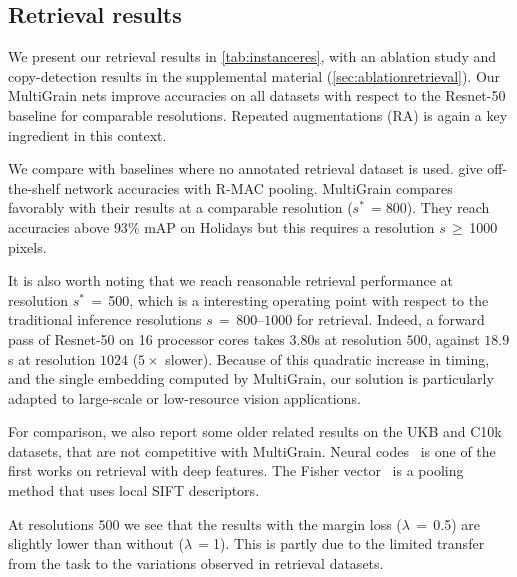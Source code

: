 \subsection{Retrieval results \label{sec:retrieval-results}}

We present our retrieval results in \cref{tab:instanceres}, with an ablation study and copy-detection results in the supplemental material (\ref{sec:ablationretrieval}). 
Our MultiGrain nets improve accuracies on all datasets with respect to the Resnet-50 baseline for comparable resolutions. 
Repeated augmentations (RA) is again a key ingredient in this context.

We compare with baselines where no annotated retrieval dataset is used. 
\cite{Gordo2016DeepIR,Gordo2017EndtoEndLO} give off-the-shelf network accuracies with R-MAC pooling. 
MultiGrain compares favorably with their results at a comparable resolution ($s^*$\,$=$800). 
They reach accuracies above $93\%$ mAP on Holidays but this requires a resolution $s$\,$\ge$\,1000 pixels. %

It is also worth noting that we reach reasonable retrieval performance at resolution $s^*$\,$=$\,500, which is a interesting operating point with respect to the traditional inference resolutions $s$\,$=$\,$800$--$1000$ for retrieval. 
Indeed, a forward pass of Resnet-50 on 16 processor cores takes $3.80$s at resolution $500$, against $18.9$s at resolution $1024$ ($5\times$ slower).
%
Because of this quadratic increase in timing, and the single embedding computed by MultiGrain, our solution is particularly adapted to large-scale or low-resource vision applications.

For comparison, we also report some older related results on the UKB and C10k datasets, that are not competitive with MultiGrain. 
Neural codes~\cite{babenko2014neural} is one of the first works on retrieval with deep features. 
The Fisher vector~\cite{jegou2012aggregating} is a pooling method that uses local SIFT descriptors. 

At resolutions $500$ we see that the results with the margin loss ($\lambda$\,$=$\,0.5) are slightly lower than without ($\lambda$\,$=$1). 
This is partly due to the limited transfer from the \inaug task to the variations observed in retrieval datasets. 

%

%
%
%



%
%
%
%
%
%
%
%

%
%
%
%
%

%
%

%



